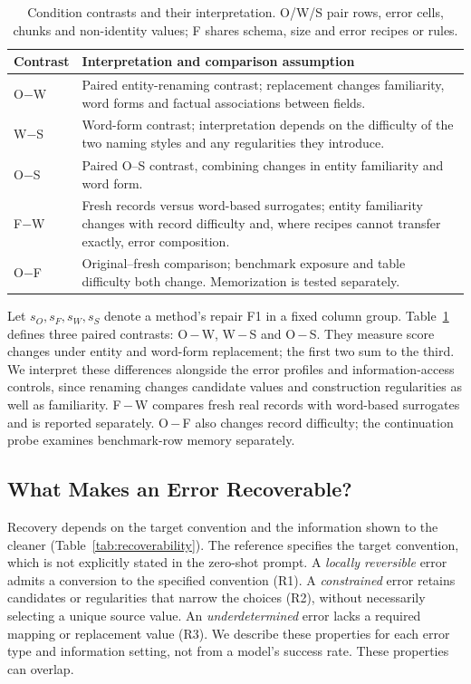 \documentclass[sigconf, nonacm]{acmart}
\begin{document}
\begin{table}[t]
  \caption{Condition contrasts and their interpretation. O/W/S pair rows, error cells, chunks
  and non-identity values; F shares schema, size and error recipes or rules.}
  \label{tab:conditions}
  \small
  \begin{tabularx}{\textwidth}{@{}l >{\raggedright\arraybackslash}X@{}}
    \toprule
    Contrast & Interpretation and comparison assumption \\
    \midrule
    O$-$W & Paired entity-renaming contrast; replacement changes familiarity, word forms and factual associations between fields. \\
    W$-$S & Word-form contrast; interpretation depends on the difficulty of the two naming styles and any regularities they introduce. \\
    O$-$S & Paired O--S contrast, combining changes in entity familiarity and word form. \\
    F$-$W & Fresh records versus word-based surrogates; entity familiarity changes with record difficulty and, where recipes cannot transfer exactly, error composition. \\
    O$-$F & Original--fresh comparison; benchmark exposure and table difficulty both change. Memorization is tested separately. \\
    \bottomrule
  \end{tabularx}
\end{table}

Let $s_O,s_F,s_W,s_S$ denote a method's repair F1 in a fixed column group.
Table~\ref{tab:conditions} defines three paired contrasts: O\,$-$\,W, W\,$-$\,S and O\,$-$\,S.
They measure score changes under entity and word-form replacement; the first two sum to the third.
We interpret these differences alongside the error profiles and information-access controls,
since renaming changes candidate values and
construction regularities as well as familiarity. F\,$-$\,W compares fresh real records with
word-based surrogates and is reported separately. O\,$-$\,F also changes record difficulty;
the continuation probe examines benchmark-row memory separately.

\subsection{What Makes an Error Recoverable?}\label{sec:recoverability}

Recovery depends on the target convention and the information shown to the cleaner
(Table~\ref{tab:recoverability}). The reference specifies the target convention, which is not
explicitly stated in the zero-shot prompt. A \emph{locally reversible} error admits a conversion to the
specified convention (R1). A \emph{constrained} error retains candidates or regularities that
narrow the choices (R2), without necessarily selecting a unique source value.
An \emph{underdetermined} error lacks a required mapping or replacement value (R3).
We describe these properties for each error type and information setting, not from a model's
success rate. These properties can overlap.
\end{document}
